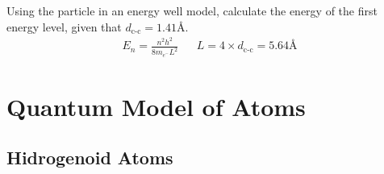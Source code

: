 \documentclass{article}[10pt]
\begin{document}
Using the particle in an energy well model, calculate the energy of the first energy
level, given that $d_{\text{c-c}}=1.41\si{\angstrom}$.
\begin{align*}
	E_n = \frac{n^2h^2}{8m_{e^{-}}L^2} &   & L=4\times d_{\text{c-c}}=5.64\si{\angstrom}
\end{align*}
\section{Quantum Model of Atoms}
\subsection{Hidrogenoid Atoms}
\end{document}
